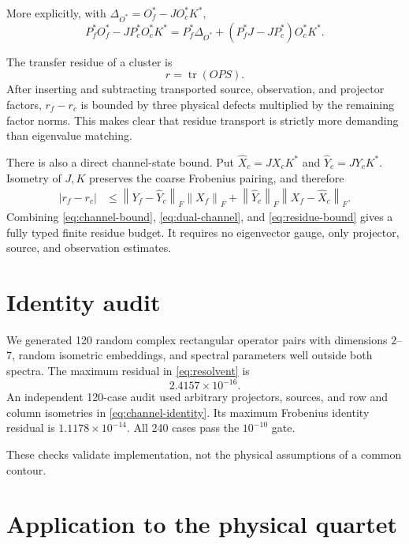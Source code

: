 \documentclass[12pt]{article}
\theoremstyle{remark}\newtheorem{remark}[theorem]{Remark}
\newcommand{\norm}[1]{\left\lVert#1\right\rVert}
\begin{document}
More explicitly, with $\Delta_{O^*}=O_f^*-JO_c^*K^*$,
\begin{equation}\label{eq:dual-channel}
 P_f^*O_f^*-JP_c^*O_c^*K^*
 =P_f^*\Delta_{O^*}+(P_f^*J-JP_c^*)O_c^*K^*.
\end{equation}

The transfer residue of a cluster is
\begin{equation}\label{eq:residue}
 r=\operatorname{tr}(OP S).
\end{equation}
After inserting and subtracting transported source, observation, and
projector factors, $r_f-r_c$ is bounded by three physical defects multiplied
by the remaining factor norms.  This makes clear that residue transport is
strictly more demanding than eigenvalue matching.

There is also a direct channel-state bound.  Put
$\widehat X_c=JX_cK^*$ and $\widehat Y_c=JY_cK^*$.  Isometry of $J,K$
preserves the coarse Frobenius pairing, and therefore
\begin{align}\label{eq:residue-bound}
 |r_f-r_c|
 &\le \norm{Y_f-\widehat Y_c}_F\norm{X_f}_F
 +\norm{\widehat Y_c}_F\norm{X_f-\widehat X_c}_F.
\end{align}
Combining \eqref{eq:channel-bound}, \eqref{eq:dual-channel}, and
\eqref{eq:residue-bound} gives a fully typed finite residue budget.  It
requires no eigenvector gauge, only projector, source, and observation
estimates.

\section{Identity audit}

We generated 120 random complex rectangular operator pairs with dimensions
$2$--$7$, random isometric embeddings, and spectral parameters well outside
both spectra.  The maximum residual in \eqref{eq:resolvent} is
\begin{equation*}
 2.4157\times10^{-16}.
\end{equation*}
An independent 120-case audit used arbitrary projectors, sources, and row and
column isometries in \eqref{eq:channel-identity}.  Its maximum Frobenius
identity residual is $1.1178\times10^{-14}$.  All 240 cases pass the
$10^{-10}$ gate.

These checks validate implementation, not the physical assumptions of a
common contour.

\section{Application to the physical quartet}
\end{document}
